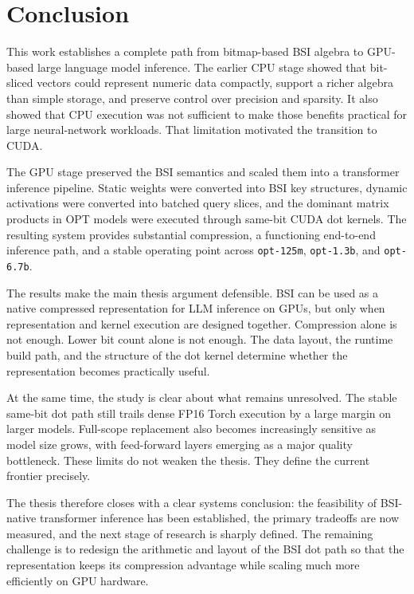 \chapter{Conclusion}

This work establishes a complete path from bitmap-based BSI algebra to GPU-based large language model inference. The earlier CPU stage showed that bit-sliced vectors could represent numeric data compactly, support a richer algebra than simple storage, and preserve control over precision and sparsity. It also showed that CPU execution was not sufficient to make those benefits practical for large neural-network workloads. That limitation motivated the transition to CUDA.

The GPU stage preserved the BSI semantics and scaled them into a transformer inference pipeline. Static weights were converted into BSI key structures, dynamic activations were converted into batched query slices, and the dominant matrix products in OPT models were executed through same-bit CUDA dot kernels. The resulting system provides substantial compression, a functioning end-to-end inference path, and a stable operating point across \texttt{opt-125m}, \texttt{opt-1.3b}, and \texttt{opt-6.7b}.

The results make the main thesis argument defensible. BSI can be used as a native compressed representation for LLM inference on GPUs, but only when representation and kernel execution are designed together. Compression alone is not enough. Lower bit count alone is not enough. The data layout, the runtime build path, and the structure of the dot kernel determine whether the representation becomes practically useful.

At the same time, the study is clear about what remains unresolved. The stable same-bit dot path still trails dense FP16 Torch execution by a large margin on larger models. Full-scope replacement also becomes increasingly sensitive as model size grows, with feed-forward layers emerging as a major quality bottleneck. These limits do not weaken the thesis. They define the current frontier precisely.

The thesis therefore closes with a clear systems conclusion: the feasibility of BSI-native transformer inference has been established, the primary tradeoffs are now measured, and the next stage of research is sharply defined. The remaining challenge is to redesign the arithmetic and layout of the BSI dot path so that the representation keeps its compression advantage while scaling much more efficiently on GPU hardware.
